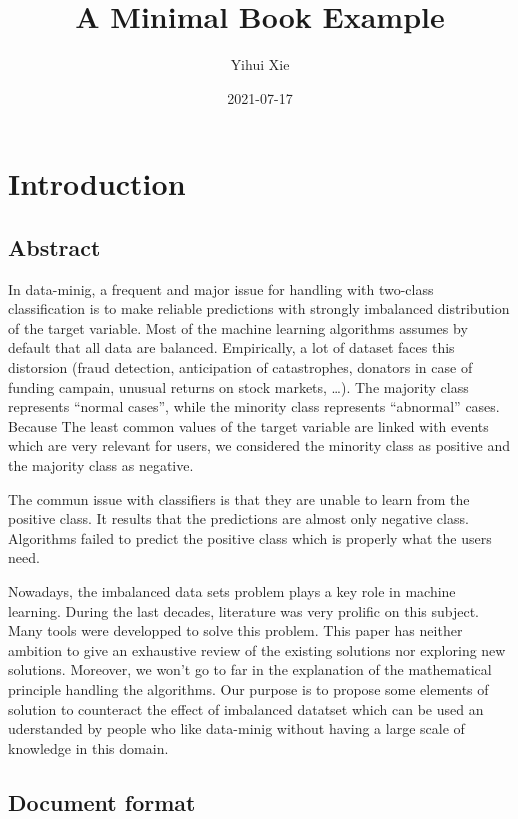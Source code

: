 \documentclass[
]{book}
\title{A Minimal Book Example}
\author{Yihui Xie}
\date{2021-07-17}
\begin{document}
\maketitle

{
\setcounter{tocdepth}{1}
\tableofcontents
}
\hypertarget{introduction}{%
\chapter{Introduction}\label{introduction}}

\hypertarget{abstract}{%
\section{Abstract}\label{abstract}}

In data-minig, a frequent and major issue for handling with two-class classification is to make reliable predictions with strongly imbalanced distribution of the target variable. Most of the machine learning algorithms assumes by default that all data are balanced. Empirically, a lot of dataset faces this distorsion (fraud detection, anticipation of catastrophes, donators in case of funding campain, unusual returns on stock markets, \ldots). The majority class represents ``normal cases'', while the minority class represents ``abnormal'' cases. Because The least common values of the target variable are linked with events which are very relevant for users, we considered the minority class as positive and the majority class as negative.

The commun issue with classifiers is that they are unable to learn from the positive class. It results that the predictions are almost only negative class. Algorithms failed to predict the positive class which is properly what the users need.

Nowadays, the imbalanced data sets problem plays a key role in machine learning. During the last decades, literature was very prolific on this subject. Many tools were developped to solve this problem. This paper has neither ambition to give an exhaustive review of the existing solutions nor exploring new solutions. Moreover, we won't go to far in the explanation of the mathematical principle handling the algorithms. Our purpose is to propose some elements of solution to counteract the effect of imbalanced datatset which can be used an uderstanded by people who like data-minig without having a large scale of knowledge in this domain.

\hypertarget{document-format}{%
\section{Document format}\label{document-format}}
\end{document}
